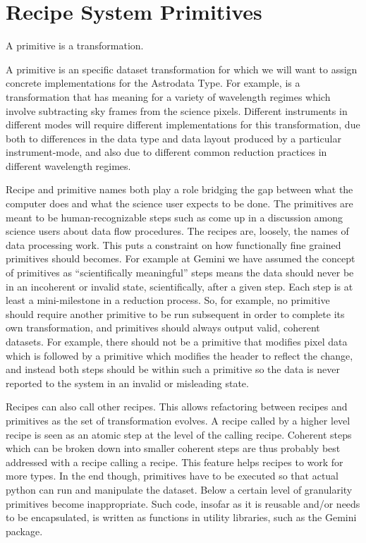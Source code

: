 \documentclass[letterpaper,10pt,english]{sphinxmanual}
\begin{document}
\section{Recipe System Primitives}
\label{gen.ADMANUAL_ADConcepts:recipe-system-primitives}
A primitive is a transformation.

A primitive is an specific dataset transformation for
which we will want to assign concrete implementations for the
Astrodata Type. For example,  is a transformation that has
meaning for a variety of wavelength regimes which involve subtracting
sky frames from the science pixels. Different
instruments in different modes will require different implementations
for this transformation, due both to differences in the data type and
data layout produced by a particular instrument-mode, and also due to
different common reduction practices in different wavelength regimes.

Recipe and primitive names both play a role bridging the gap between
what the computer does and what the science user expects to be done.
The primitives are meant to be human-recognizable steps such as come
up in a discussion among science users about data flow procedures. The
recipes are, loosely, the names of data processing work.
This puts a constraint on how functionally fine grained primitives
should becomes. For example at Gemini we have assumed the concept of
primitives as ``scientifically meaningful'' steps means the data should
never be in an incoherent or invalid state, scientifically, after a
given step. Each step is at least a mini-milestone in a reduction
process. So, for example, no primitive should require another
primitive to be run subsequent in order to complete its own
transformation, and primitives should always output valid, coherent
datasets. For example, there should not be a primitive that modifies pixel
data which is followed by a primitive which modifies the header to
reflect the change, and instead both steps should be within such a
primitive so the data is never reported to the system in an invalid or
misleading state.

Recipes can also call other recipes.  This allows refactoring between
recipes and primitives as the set of transformation evolves. A recipe
called by a higher level recipe is seen as an atomic step at the level
of the calling recipe. Coherent steps
which can be broken down into smaller coherent steps are thus probably
best addressed with a recipe calling a recipe. This feature helps
recipes to work for more types. In the end though, primitives have to be
executed so that actual python can run and manipulate the dataset. Below
a certain level of granularity primitives become inappropriate.
Such code, insofar as it is reusable and/or needs to be encapsulated,
is written as functions in utility libraries, such as the Gemini
 package.
\end{document}
